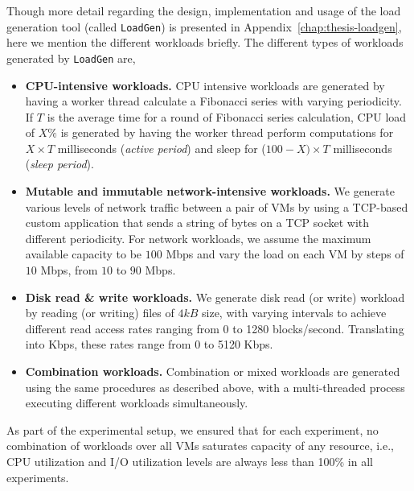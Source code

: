 Though more detail regarding the design, implementation
and usage of the load generation tool (called \texttt{LoadGen})
is presented in Appendix~\ref{chap:thesis-loadgen}, here 
we mention the different workloads briefly.
The different types of workloads generated by \texttt{LoadGen} are,
% 
\begin{itemize}
\item \textbf{CPU-intensive workloads.}
CPU intensive workloads are generated by having a worker
thread calculate a Fibonacci series with varying periodicity.
If $T$ is the average time for a round of Fibonacci series calculation,
CPU load of $X\%$ is generated by having the worker thread perform
computations for $X \times T$ milliseconds (\emph{active period}) and
sleep for ($100-X) \times T$ milliseconds (\emph{sleep period}).
\item \textbf{Mutable and immutable network-intensive workloads.} 
We generate various levels of network traffic between a pair of VMs by using
a TCP-based custom application that sends a string of bytes on a
TCP socket with different periodicity.
For network workloads, we assume the maximum available capacity 
to be $100$ Mbps and vary the load on each VM by steps 
of $10$ Mbps, from $10$ to $90$ Mbps.
\item \textbf{Disk read \& write workloads.}
We generate disk read (or write) workload by reading (or writing) files  
of $4 kB$ size, with varying intervals to achieve different read access
rates ranging from 0 to 1280 blocks/second. Translating into Kbps, these
rates range from 0 to 5120 Kbps.
\item \textbf{Combination workloads.}
Combination or mixed workloads are generated using 
the same procedures as described above, with a 
multi-threaded process executing different workloads 
simultaneously.
\end{itemize}
As part of the experimental setup, we ensured that for each 
experiment, no combination of workloads over all VMs 
saturates capacity of any resource, i.e., CPU utilization and 
I/O utilization levels are always less than 100\% in all experiments.

